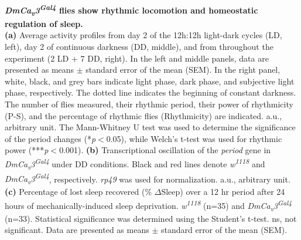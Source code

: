 \label{fig:4}
\textbf{ \emph{DmCa\textsubscript{v}3\textsuperscript{Gal4}} flies show rhythmic locomotion and homeostatic regulation of sleep.}
\\
\textbf{(a)} Average activity profiles from day 2 of the 12h:12h light-dark cycles (LD, left), day 2 of continuous darkness (DD, middle), and from throughout the experiment (2 LD + 7 DD, right).
In the left and middle panels, data are presented as means $\pm$ standard error of the mean (SEM).
In the right panel, white, black, and grey bars indicate light phase, dark phase, and subjective light phase, respectively.
The dotted line indicates the beginning of constant darkness. 
The number of flies measured, their rhythmic period, their power of rhythmicity (P-S), and the percentage of rhythmic flies (Rhythmicity) are indicated.
a.u., arbitrary unit.
The Mann-Whitney U test was used to determine the significance of the period changes (*\emph{p}$<$0.05), while Welch's t-test was used for rhythmic power (***\emph{p}$<$0.001). 
\textbf{(b)} Transcriptional oscillation of the \emph{period} gene in \emph{DmCa\textsubscript{v}3\textsuperscript{Gal4}} under DD conditions. Black and red lines denote \emph{w\textsuperscript{1118}} and \emph{DmCa\textsubscript{v}3\textsuperscript{Gal4}}, respectively.
\emph{rp49} was used for normalization.
a.u., arbitrary unit.
\textbf{(c)} Percentage of lost sleep recovered (\% $\Delta$Sleep) over a 12 hr period after 24 hours of mechanically-induced sleep deprivation. \emph{w\textsuperscript{1118}} (n=35) and \emph{DmCa\textsubscript{v}3\textsuperscript{Gal4}} (n=33). 
Statistical significance was determined using the Student's t-test. 
ns, not significant.
Data are presented as means $\pm$ standard error of the mean (SEM).
